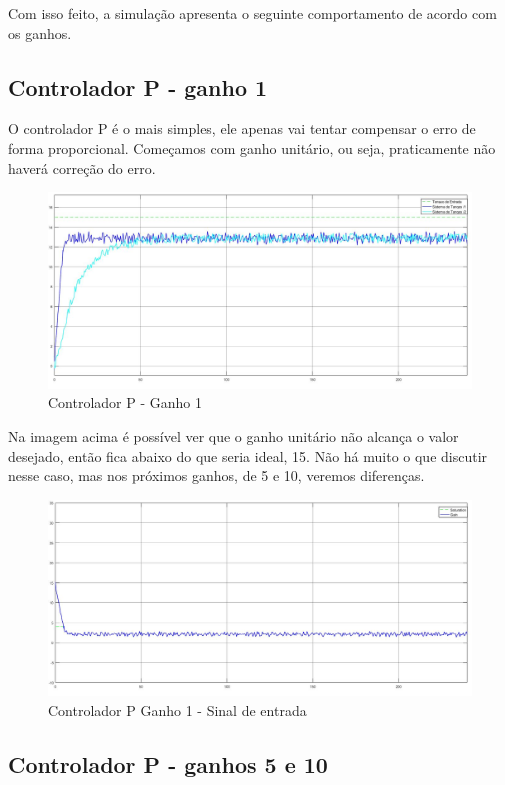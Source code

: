 \documentclass[
	12pt,				%
	openany,			%
	oneside,			%
	a4paper,			%
	english,			%
	french,				%
	spanish,			%
	brazil,				%
	]{abntex2}
\begin{document}
{Com isso feito, a simulação apresenta o seguinte comportamento de acordo com os ganhos.

\subsection{Controlador P - ganho 1}

O controlador P é o mais simples, ele apenas vai tentar compensar o erro de forma proporcional. Começamos com ganho unitário, ou seja, praticamente não haverá correção do erro.

\begin{figure}[h]
	\centering
	\includegraphics[scale=0.30]{controlador_p_ganho_1.jpg}
	\caption{Controlador P - Ganho 1}
\end{figure}

Na imagem acima é possível ver que o ganho unitário não alcança o valor desejado, então fica abaixo do que seria ideal, 15. Não há muito o que discutir nesse caso, mas nos próximos ganhos, de 5 e 10, veremos diferenças.

\begin{figure}[h]
	\centering
	\includegraphics[scale=0.30]{osciloscopio_ganho_1.jpg}
	\caption{Controlador P Ganho 1 - Sinal de entrada}
\end{figure}

\subsection{Controlador P - ganhos 5 e 10}

}
\end{document}
